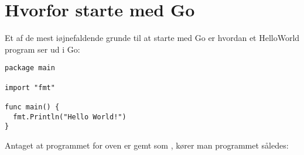 





\section{Hvorfor starte med Go}

Et af de mest iøjnefaldende grunde til at starte med Go er hvordan et
HelloWorld program ser ud i Go:

\begin{lstlisting}
package main

import "fmt"

func main() {
  fmt.Println("Hello World!")
}
\end{lstlisting}

Antaget at programmet for oven er gemt som , kører man
programmet således:

